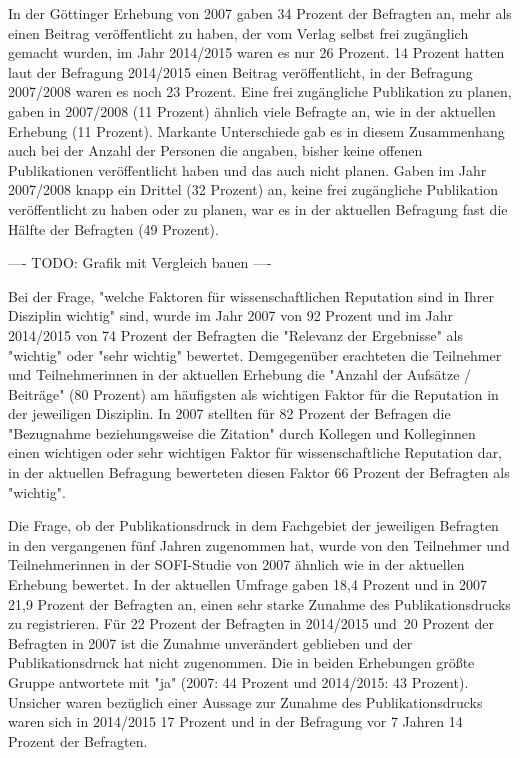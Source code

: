 In der Göttinger Erhebung von 2007 gaben 34 Prozent der Befragten an, mehr als einen Beitrag veröffentlicht zu haben, der vom Verlag selbst frei zugänglich gemacht wurden, im Jahr 2014/2015 waren es nur 26 Prozent. 14 Prozent hatten laut der Befragung 2014/2015 einen Beitrag veröffentlicht, in der Befragung 2007/2008 waren es noch 23 Prozent. Eine frei zugängliche Publikation zu planen, gaben in 2007/2008 (11 Prozent) ähnlich viele Befragte an, wie in der aktuellen Erhebung (11 Prozent). Markante Unterschiede gab es in diesem Zusammenhang auch bei der Anzahl der Personen die angaben, bisher keine offenen Publikationen veröffentlicht haben und das auch nicht planen. Gaben im Jahr 2007/2008 knapp ein Drittel (32 Prozent) an, keine frei zugängliche Publikation veröffentlicht zu haben oder zu planen, war es in der aktuellen Befragung fast die Hälfte der Befragten (49 Prozent).

---- TODO: Grafik mit Vergleich bauen ----

Bei der Frage, "welche Faktoren für wissenschaftlichen Reputation sind in Ihrer Disziplin wichtig" sind, wurde im Jahr 2007 von 92 Prozent und im Jahr 2014/2015 von 74 Prozent der Befragten die "Relevanz der Ergebnisse" als "wichtig" oder "sehr wichtig" bewertet. Demgegenüber erachteten die Teilnehmer und Teilnehmerinnen in der aktuellen Erhebung die "Anzahl der Aufsätze / Beiträge" (80 Prozent) am häufigsten als wichtigen Faktor für die Reputation in der jeweiligen Disziplin. In 2007 stellten für 82 Prozent der Befragen die "Bezugnahme beziehungsweise die Zitation" durch Kollegen und Kolleginnen einen wichtigen oder sehr wichtigen Faktor für wissenschaftliche Reputation dar, in der aktuellen Befragung bewerteten diesen Faktor 66 Prozent der Befragten als "wichtig".

Die Frage, ob der Publikationsdruck in dem Fachgebiet der jeweiligen Befragten in den vergangenen fünf Jahren zugenommen hat, wurde von den Teilnehmer und Teilnehmerinnen in der SOFI-Studie von 2007 ähnlich wie in der aktuellen Erhebung bewertet. In der aktuellen Umfrage gaben 18,4 Prozent und in 2007 21,9 Prozent der Befragten an, einen sehr starke Zunahme des Publikationsdrucks zu registrieren. Für 22 Prozent der Befragten in 2014/2015 und 20 Prozent der Befragten in 2007 ist die Zunahme unverändert geblieben und der Publikationsdruck hat nicht zugenommen. Die in beiden Erhebungen größte Gruppe antwortete mit "ja" (2007: 44 Prozent und 2014/2015: 43 Prozent). Unsicher waren bezüglich einer Aussage zur Zunahme des Publikationsdrucks waren sich in 2014/2015 17 Prozent und in der Befragung vor 7 Jahren 14 Prozent der Befragten.

